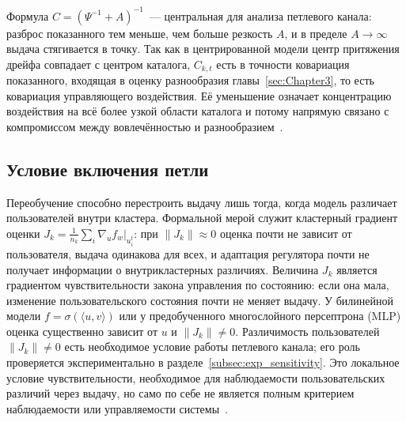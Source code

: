 Формула $C=(\Psi^{-1}+A)^{-1}$~--- центральная для анализа петлевого канала:
разброс показанного тем меньше, чем больше резкость $A$, и в пределе
$A\to\infty$ выдача стягивается в точку. Так как в центрированной модели центр
притяжения дрейфа совпадает с центром каталога, $C_{k,t}$ есть в точности
ковариация показанного, входящая в оценку разнообразия
главы~\ref{sec:Chapter3}, то есть ковариация управляющего воздействия. Её
уменьшение означает концентрацию воздействия на всё более узкой области каталога
и потому напрямую связано с
компромиссом между вовлечённостью и разнообразием~\cite{mariano2026optimalControl,
chandrasekaran2026networkAware}.

\subsection{Условие включения петли}
\label{subsec:activation}

Переобучение способно перестроить выдачу лишь тогда, когда модель различает
пользователей внутри кластера. Формальной мерой служит кластерный градиент
оценки $J_k=\tfrac1{n_k}\sum_{i}\nabla_u f_w\big\rvert_{u_i^t}$: при
$\lVert J_k\rVert\approx0$ оценка почти не зависит от пользователя, выдача
одинакова для всех, и адаптация регулятора почти не получает информации о
внутрикластерных различиях. Величина $J_k$ является градиентом чувствительности
закона управления по состоянию: если она мала, изменение пользовательского
состояния почти не меняет выдачу. У билинейной модели
$f=\sigma(\langle u,v\rangle)$ или у предобученного многослойного персептрона
(MLP) оценка существенно зависит от $u$ и $\lVert J_k\rVert\neq0$.
Различимость пользователей $\lVert J_k\rVert\neq0$ есть необходимое условие
работы петлевого канала; его роль проверяется экспериментально в
разделе~\ref{subsec:exp_sensitivity}. Это локальное условие чувствительности,
необходимое для наблюдаемости пользовательских различий через выдачу, но само по
себе не является полным критерием наблюдаемости или управляемости
системы~\cite{depasquale2026controlSystems,
chandrasekaran2026networkAware}.
